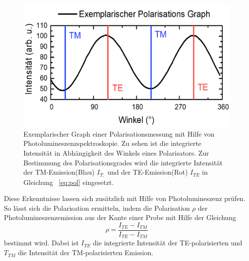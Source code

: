 \begin{figure}[ht!]
  \centering
  \begin{minipage}{\linewidth}
      \centering
      \includegraphics[width=0.6\linewidth]{Bilder/exemplPolGraph.png}
      \caption{Exemplarischer Graph einer Polarisationsmessung mit Hilfe von Photolumineszenzspektroskopie. Zu sehen ist die integrierte Intensität in Abhängigkeit des Winkels eines Polarisators. Zur Bestimmung des Polarisationsgrades wird die integrierte Intensität der TM-Emission(Blau) $I_{T;}$  und der TE-Emission(Rot) $I_{TE}$ in Gleichung ~\ref{eq:pol} eingesetzt.}
      \label{fig:degra}
  \end{minipage}
\end{figure}
Diese Erkenntnisse lassen sich zusätzlich mit Hilfe von Photolumineszenz prüfen. So lässt sich die Polarisation ermitteln, indem die Polarisation $\rho$ der Photolumineszenzemission aus der Kante einer Probe mit Hilfe der Gleichung 
\begin{equation}
\rho = \frac{ I_{TE} - I_{TM} }{ I_{TE} - I_{TM} } 
\label{eq:pol}
\end{equation}
bestimmt wird. Dabei ist $I_{TE}$ die integrierte Intensität der TE-polarisierten und $T_{TM}$ die Intensität der TM-polarisierten Emission. 
 


